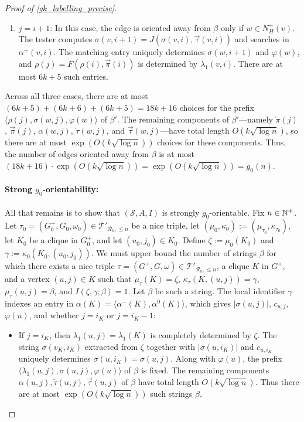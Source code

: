 \documentclass{patmorin}
\renewcommand{\le}{\leqslant}
\newcommand{\Oh}{O}
\newcommand{\calR}{\mathcal{R}}
\newcommand{\calS}{\mathcal{S}}
\newcommand{\calT}{\mathcal{T}}
\begin{document}
\begin{proof}[Proof of \cref{gk_labelling_precise}]
\begin{enumerate}
    \item $j=i+1$: In this case, the edge is oriented away from $\beta$ only if $w\in N^+_H(v)$. The tester computes $\sigma(v,i+1)=J(\sigma(v,i),\overrightarrow{\tau}(v,i))$ and searches in $\alpha^+(v,i)$. The matching entry uniquely determines $\sigma(w,i+1)$ and $\varphi(w)$, and $\rho(j)=F(\rho(i),\overrightarrow{\pi}(i))$ is determined by $\lambda_1(v,i)$. There are at most $6k+5$ such entries.
  \end{enumerate}
  Across all three cases, there are at most $(6k+5)+(6k+6)+(6k+5) = 18k+16$ choices for the prefix $\langle \rho(j), \sigma(w,j), \varphi(w)\rangle$ of $\beta'$. The remaining components of $\beta'$---namely $\overleftarrow{\pi}(j)$, $\overrightarrow{\pi}(j)$, $\alpha(w,j)$, $\overleftarrow{\tau}(w,j)$, and $\overrightarrow{\tau}(w,j)$---have total length $\Oh(k\sqrt{\log n})$, so there are at most $\exp(\Oh(k\sqrt{\log n}))$ choices for these components. Thus, the number of edges oriented away from $\beta$ is at most $(18k+16)\cdot \exp(\Oh(k\sqrt{\log n})) = \exp(\Oh(k\sqrt{\log n})) = g_0(n)$.

  \paragraph{\boldmath Strong $g_0$-orientability:}  
  All that remains is to show that $(\calS,A,I)$ is strongly $g_0$-orientable. Fix $n\in\mathbb{N}^+$. Let $\tau_0=(G^+_0,G_0,\omega_0)\in\calT'_{\calR_k,\le n}$ be a nice triple, let $(\mu_0,\kappa_0):=(\mu_{\tau_0}, \kappa_{\tau_0})$, let $K_0$ be a clique in $G^+_0$, and let $(u_0,j_0)\in K_0$. Define $\zeta:=\mu_0(K_0)$ and $\gamma:=\kappa_0(K_0,(u_0,j_0))$. We must upper bound the number of strings $\beta$ for which there exists a nice triple $\tau=(G^+,G,\omega)\in\calT'_{\calR_k,\le n}$, a clique $K$ in $G^+$, and a vertex $(u,j)\in K$ such that $\mu_\tau(K)=\zeta$, $\kappa_\tau(K,(u,j))=\gamma$, $\mu_\tau(u,j)=\beta$, and $I(\zeta,\gamma,\beta)=1$. Let $\beta$ be such a string. The local identifier $\gamma$ indexes an entry in $\alpha(K) = \langle \alpha^-(K), \alpha^0(K)\rangle$, which gives $|\sigma(u,j)|$, $c_{u,j}$, $\varphi(u)$, and whether $j=i_K$ or $j=i_K-1$:
  \begin{itemize}[nosep,nolistsep] 
    \item If $j=i_K$, then $\lambda_1(u,j)=\lambda_1(K)$ is completely determined by $\zeta$. The string $\sigma(v_K,i_K)$ extracted from $\zeta$ together with $|\sigma(u,i_K)|$ and $c_{u,i_K}$ uniquely determines $\sigma(u,i_K)=\sigma(u,j)$. Along with $\varphi(u)$, the prefix $\langle \lambda_1(u,j), \sigma(u,j), \varphi(u)\rangle$ of $\beta$ is fixed. The remaining components $\alpha(u,j), \overleftarrow{\tau}(u,j), \overrightarrow{\tau}(u,j)$ of $\beta$ have total length $\Oh(k\sqrt{\log n})$. Thus there are at most $\exp(\Oh(k\sqrt{\log n}))$ such strings $\beta$.


\end{itemize}
\end{proof}
\end{document}
